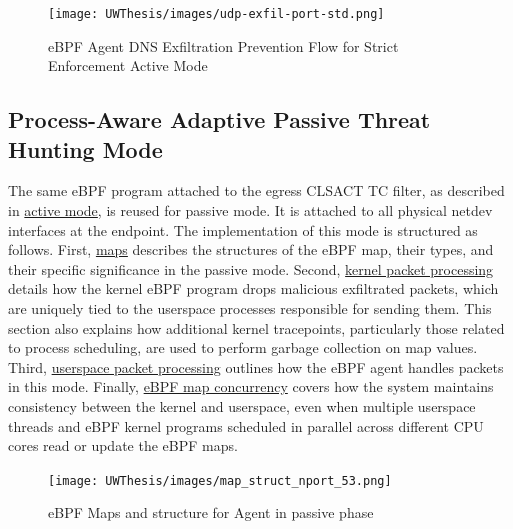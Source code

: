 \documentclass [11pt, proquest] {uwthesis}[2020/02/24]
\begin{document}
\label{sec:data_plane_standard_port}
\begin{figure}[H]
    \texttt{[image: UWThesis/images/udp-exfil-port-std.png]}
\caption{eBPF Agent DNS Exfiltration Prevention Flow for Strict Enforcement Active Mode}
\label{sec:dp-active-phase}
\end{figure}

\subsection{Process-Aware Adaptive Passive Threat Hunting Mode}
\label{sec:passive}
The same eBPF program attached to the egress CLSACT TC filter, as described in \hyperref[sec:active]{active mode}, is reused for passive mode. It is attached to all physical netdev interfaces at the endpoint. The implementation of this mode is structured as follows. First, \hyperref[sec:maps]{maps} describes the structures of the eBPF map, their types, and their specific significance in the passive mode. Second, \hyperref[passive:sec1]{kernel packet processing} details how the kernel eBPF program drops malicious exfiltrated packets, which are uniquely tied to the userspace processes responsible for sending them. This section also explains how additional kernel tracepoints, particularly those related to process scheduling, are used to perform garbage collection on map values. Third, \hyperref[passive:sec2]{userspace packet processing} outlines how the eBPF agent handles packets in this mode. Finally, \hyperref[passive:sec3]{eBPF map concurrency} covers how the system maintains consistency between the kernel and userspace, even when multiple userspace threads and eBPF kernel programs scheduled in parallel across different CPU cores read or update the eBPF maps.


\begin{figure}[H]
\centering
\texttt{[image: UWThesis/images/map\_struct\_nport\_53.png]}
\caption{eBPF Maps and structure for Agent in passive phase}
\label{sec:dp_eBPF_LRU_Maps_passive}
\end{figure}
\end{document}
